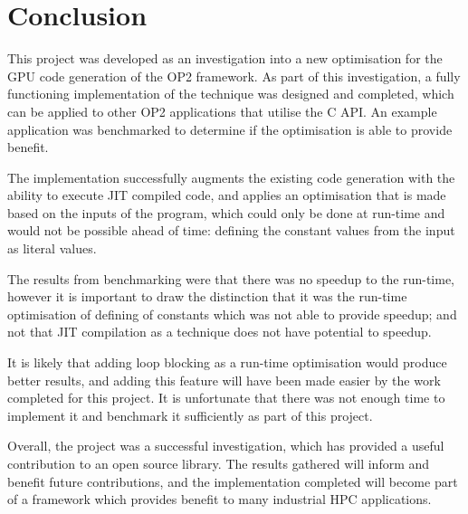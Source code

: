 
\section{Conclusion}
\label{s:conc}

This project was developed as an investigation into a new optimisation for the GPU code generation of the OP2 framework. As part of this investigation, a fully functioning implementation of the technique was designed and completed, which can be applied to other OP2 applications that utilise the C API. An example application was benchmarked to determine if the optimisation is able to provide benefit.
\par
The implementation successfully augments the existing code generation with the ability to execute JIT compiled code, and applies an optimisation that is made based on the inputs of the program, which could only be done at run-time and would not be possible ahead of time: defining the constant values from the input as literal values.
\par
The results from benchmarking were that there was no speedup to the run-time, however it is important to draw the distinction that it was the run-time optimisation of defining of constants which was not able to provide speedup; and not that JIT compilation as a technique does not have potential to speedup.
\par
It is likely that adding loop blocking as a run-time optimisation would produce better results, and adding this feature will have been made easier by the work completed for this project. It is unfortunate that there was not enough time to implement it and benchmark it sufficiently as part of this project.\\
\par
Overall, the project was a successful investigation, which has provided a useful contribution to an open source library. The results gathered will inform and benefit future contributions, and the implementation completed will become part of a framework which provides benefit to many industrial HPC applications.
